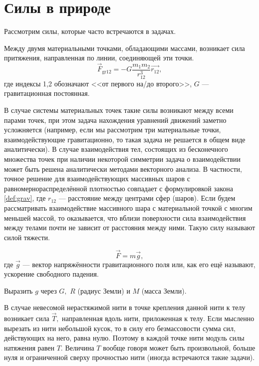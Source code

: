 \section{Силы в природе}
Рассмотрим силы, которые часто встречаются в задачах.
\begin{definition}[Гравитация]
Между двумя материальными точками, обладающими массами, возникает сила
притяжения, направленная по линии, соединяющей эти точки.
$$\vec{F}_\text{gr12} = -G \frac{m_1m_2}{r_{12}^3}\vec{r_{12}},$$
где индексы 1,2 обозначают <<от первого на/до второго>>,
$G$ --- гравитационная постоянная.
\label{def:grav}
\end{definition}
В случае системы материальных точек такие силы возникают между всеми парами точек,
при этом задача нахождения уравнений движений заметно усложняется (например, если мы
рассмотрим три материальные точки, взаимодействующие гравитационно, то такая задача
не решается в общем виде аналитически). В случае взаимодействия тел, состоящих из
бесконечного множества точек при наличии некоторой симметрии задача о взаимодействии может быть
решена аналитически методами векторного анализа. В частности, точное решение
для взаимодействующих массивных шаров с равномернораспределённой плотностью совпадает
с формулировкой закона \ref{def:grav}, где $r_{12}$ --- расстояние между центрами сфер (шаров).
Если будем рассматривать взаимодействие массивного шара с материальной точкой с многим меньшей массой,
то оказывается, что вблизи поверхности сила взаимодействия между телами почти не зависит от
расстояния между ними. Такую силу называют силой тяжести.
\begin{definition}
$$\vec{F} = m\vec{g},$$
где $\vec{g}$ --- вектор напряжённости гравитационного поля
или, как его ещё называют, ускорение свободного падения.
\end{definition}
\begin{task}
Выразить $g$ через $G,$ $R$ (радиус Земли) и $M$ (масса Земли).
\end{task}
\begin{definition}
В случае невесомой нерастяжимой нити в точке крепления
данной нити к телу возникает сила $\vec{T},$ направленная вдоль нити, приложенная к телу.
Если мысленно вырезать из нити небольшой кусок, то в силу его безмассовости
сумма сил, действующих на него, равна нулю. Поэтому в каждой точке нити модуль
силы натяжения равен $T.$ Величина $T$ вообще говоря может быть произвольной,
больше нуля и ограниченной сверху прочностью нити (иногда встречаются такие задачи).
\end{definition}
